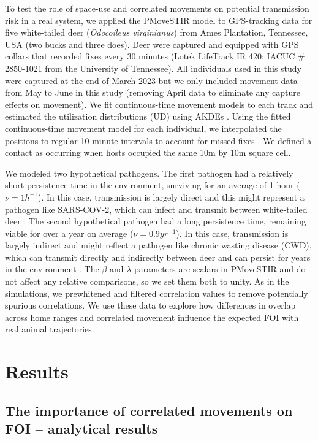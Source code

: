 \documentclass[letterpaper]{article}
\begin{document}
To test the role of space-use and correlated movements on potential transmission risk in a real system, we applied the PMoveSTIR model to GPS-tracking data for five white-tailed deer (\emph{Odocoileus virginianus}) from Ames Plantation, Tennessee, USA (two bucks and three does). 
Deer were captured and equipped with GPS collars that recorded fixes every 30 minutes (Lotek LifeTrack IR 420; IACUC \# 2850-1021 from the University of Tennessee).  All individuals used in this study were captured at the end of March 2023 but we only included movement data from May to June in this study (removing April data to eliminate any capture effects on movement).  We fit continuous-time movement models to each track and estimated the utilization distributions (UD) using AKDEs \citep{Calabrese2016}. Using the fitted continuous-time movement model for each individual, we interpolated the positions to regular 10 minute intervals to account for missed fixes \citep{Yang2023}.  We defined a contact as occurring when hosts occupied the same 10m by 10m square cell.  

We modeled two hypothetical pathogens. The first pathogen had a relatively short persistence time in the environment, surviving for an average of 1 hour  ($\nu=1 h^{-1}$). In this case, transmission is largely direct and this might represent a pathogen like SARS-COV-2, which can infect and transmit between white-tailed deer \citep{Hale2022}. The second hypothetical pathogen had a long persistence time, remaining viable for over a year on average ($\nu=0.9 yr^{-1}$). In this case, transmission is largely indirect and might reflect a pathogen like chronic wasting disease (CWD), which can transmit directly and indirectly between deer and can persist for years in the environment \citep{Saunders2012a}. The $\beta$ and $\lambda$ parameters are scalars in PMoveSTIR and do not affect any relative comparisons, so we set them both to unity. As in the simulations, we prewhitened and filtered correlation values to remove potentially spurious correlations. 
We use these data to explore how differences in overlap across home ranges and correlated movement influence the expected FOI with real animal trajectories.

\section*{Results}

\subsection*{The importance of correlated movements on FOI -- analytical results}
\end{document}

